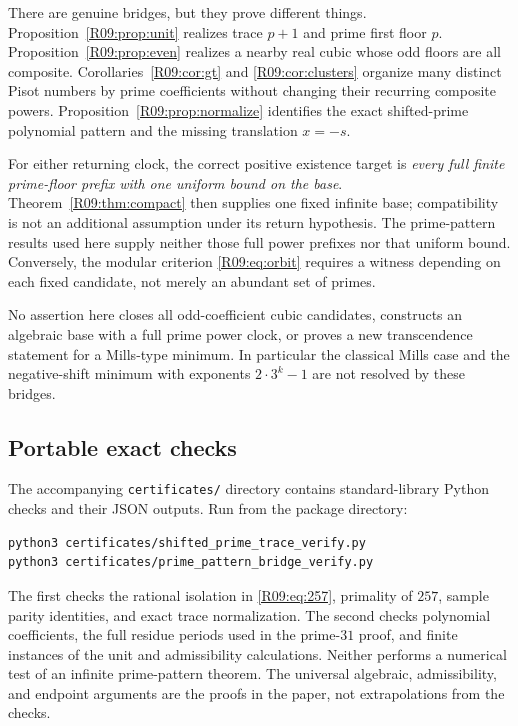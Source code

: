 \documentclass[11pt,a4paper]{article}
\theoremstyle{definition}\newtheorem{definition}[theorem]{Definition}
\theoremstyle{remark}\newtheorem{remark}[theorem]{Remark}
\begin{document}
There are genuine bridges, but they prove different things.
Proposition~\ref{R09:prop:unit} realizes trace $p+1$ and prime first floor
$p$. Proposition~\ref{R09:prop:even} realizes a nearby real cubic whose
odd floors are all composite. Corollaries~\ref{R09:cor:gt} and
\ref{R09:cor:clusters} organize many distinct Pisot numbers by prime
coefficients without changing their recurring composite powers.
Proposition~\ref{R09:prop:normalize} identifies the exact shifted-prime
polynomial pattern and the missing translation $x=-s$.

For either returning clock, the correct positive existence target is
\emph{every full finite prime-floor prefix with one uniform bound on
the base}. Theorem~\ref{R09:thm:compact} then supplies one fixed infinite
base; compatibility is not an additional assumption under its return
hypothesis. The prime-pattern results used here supply neither those
full power prefixes nor that uniform bound. Conversely, the modular
criterion \eqref{R09:eq:orbit} requires a witness depending on each fixed
candidate, not merely an abundant set of primes.

No assertion here closes all odd-coefficient cubic candidates,
constructs an algebraic base with a full prime power clock, or proves
a new transcendence statement for a Mills-type minimum. In particular
the classical Mills case and the negative-shift minimum with exponents
$2\cdot3^k-1$ are not resolved by these bridges.


\subsection{Portable exact checks}

The accompanying \texttt{certificates/} directory contains standard-library
Python checks and their JSON outputs. Run from the package directory:
\begin{verbatim}
python3 certificates/shifted_prime_trace_verify.py
python3 certificates/prime_pattern_bridge_verify.py
\end{verbatim}
The first checks the rational isolation in \eqref{R09:eq:257}, primality
of $257$, sample parity identities, and exact trace normalization.
The second checks polynomial coefficients, the full residue periods
used in the prime-$31$ proof, and finite instances of the unit and
admissibility calculations. Neither performs a numerical test of an
infinite prime-pattern theorem. The universal algebraic, admissibility,
and endpoint arguments are the proofs in the paper, not extrapolations
from the checks.
\end{document}
